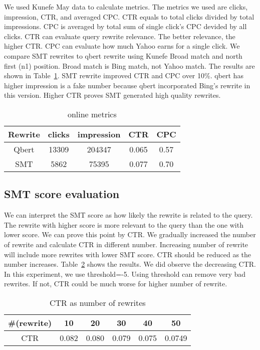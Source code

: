\documentclass{sig-alternate}
\begin{document}
We used Kunefe May data to calculate metrics. The metrics we used are clicks, impression, CTR, and averaged CPC.  CTR equals to total clicks divided by total impressions. CPC is averaged by total sum of single click's CPC devided by all clicks. CTR can evaluate query rewrite relevance. The better relevance, the higher CTR. CPC can evaluate how much Yahoo earns for a single click. We compare SMT rewrites to qbert rewrite using Kunefe Broad match and north first (n1) position. Broad match is Bing match, not Yahoo match. The results are shown in Table~\ref{table:ctr}. SMT rewrite improved CTR and CPC over 10\%.  qbert has higher impression is a fake number because qbert incorporated Bing's rewrite in this version. Higher CTR proves SMT generated high quality rewrites.
\begin{table}
\caption{online metrics}
\begin{tabular}{|c|c|c|c|c|}  \hline 
 Rewrite & clicks & impression & CTR  & CPC \\ \hline
 Qbert & 13309 & 204347 & 0.065 & 0.57   \\ \hline
SMT & 5862 & 75395 & 0.077 & 0.70 \\ \hline
\end{tabular}
\label{table:ctr}
\end{table}

\subsection{SMT score evaluation}
We can interpret the SMT score as how likely the rewrite is related to the query. The rewrite with higher score is more relevant to the query than the one with lower score. We can prove this point by CTR. We gradually increased the number of rewrite and calculate CTR in different number. Increasing number of rewrite will include more rewrites with lower SMT score. CTR should be reduced as the number increases.  Table~\ref{table:rwnum} shows the results. We did observe the decreasing CTR. In this experiment, we use threshold=-5. Using threshold can remove very bad rewrites. If not, CTR could be much worse for higher number of rewrite.
\begin{table}
\caption{CTR as number of rewrites}
\begin{tabular}{|c|c|c|c|c|c|} \hline
\#(rewrite) & 10 & 20 &30 &40 & 50 \\ \hline
CTR & 0.082 & 0.080 & 0.079 & 0.075 & 0.0749  \\  \hline
\end{tabular}
\label{table:rwnum}
\end{table}
\end{document}
